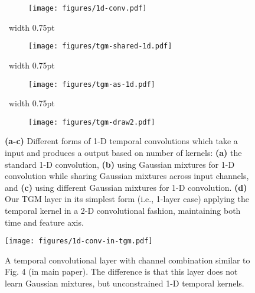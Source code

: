 \documentclass{article}
\newcommand{\rulesep}{\unskip\ \vrule width 0.75pt\ }
\begin{document}
\begin{figure*}
\centering
  \begin{subfigure}{.24\textwidth}
  \centering
    \texttt{[image: figures/1d-conv.pdf]}
    \caption{}\label{afig:conv1d}
  \end{subfigure}\rulesep \begin{subfigure}{.24\textwidth}
  \centering
    \texttt{[image: figures/tgm-shared-1d.pdf]}
    \caption{}\label{afig:tgm-shared-1d}
  \end{subfigure}\rulesep \begin{subfigure}{.24\textwidth}
  \centering
    \texttt{[image: figures/tgm-as-1d.pdf]}
    \caption{}\label{afig:tgm-as-1d}
  \end{subfigure}\rulesep \begin{subfigure}{.22\textwidth}
  \centering
    \texttt{[image: figures/tgm-draw2.pdf]}
    \caption{}\label{afig:real-tgm}
  \end{subfigure}
  \caption{{\bf (a-c)} Different forms of 1-D temporal convolutions which take a  input and produces a  output based on  number of  kernels: {\bf (a)} the standard 1-D convolution, {\bf (b)} using Gaussian mixtures for 1-D convolution while sharing Gaussian mixtures across input channels, and {\bf (c)} using  different Gaussian mixtures for 1-D convolution. {\bf (d)} Our TGM layer in its simplest form (i.e., 1-layer case) applying the  temporal kernel in a 2-D convolutional fashion, maintaining both time and feature axis.}
  \label{afig:various-baselines}
\end{figure*}



\begin{figure*}
    \centering
    \texttt{[image: figures/1d-conv-in-tgm.pdf]}
    \caption{A temporal convolutional layer with channel combination similar to Fig. 4 (in main paper). The difference is that this layer does not learn Gaussian mixtures, but unconstrained 1-D temporal kernels.}
    \label{fig:tgm-with-1d}
\end{figure*}
\end{document}
